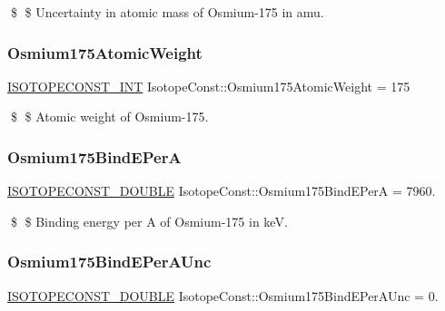 \$ \$ Uncertainty in atomic mass of Osmium-\/175 in amu. \mbox{\label{group___isotope_const-_osmium-_os175_ga68d651baca5291ae24003e9ae0e879c8}} 
\subsubsection{\texorpdfstring{Osmium175\+Atomic\+Weight}{Osmium175AtomicWeight}}
{\footnotesize\ttfamily \mbox{\hyperlink{group___isotope_const-_macros_ga5f18360b3e99483a35c32d789e62621c}{I\+S\+O\+T\+O\+P\+E\+C\+O\+N\+S\+T\+\_\+\+I\+NT}} Isotope\+Const\+::\+Osmium175\+Atomic\+Weight = 175}

\$ \$ Atomic weight of Osmium-\/175. \mbox{\label{group___isotope_const-_osmium-_os175_ga2d6c236720e29dd7ca31d141ead0cc20}} 
\subsubsection{\texorpdfstring{Osmium175\+Bind\+E\+PerA}{Osmium175BindEPerA}}
{\footnotesize\ttfamily \mbox{\hyperlink{group___isotope_const-_macros_ga8f45a7272ce02c0b4c65c44636ed719a}{I\+S\+O\+T\+O\+P\+E\+C\+O\+N\+S\+T\+\_\+\+D\+O\+U\+B\+LE}} Isotope\+Const\+::\+Osmium175\+Bind\+E\+PerA = 7960.}

\$ \$ Binding energy per A of Osmium-\/175 in keV. \mbox{\label{group___isotope_const-_osmium-_os175_gaedbee545d68a3e1fc7791326d27b60b5}} 
\subsubsection{\texorpdfstring{Osmium175\+Bind\+E\+Per\+A\+Unc}{Osmium175BindEPerAUnc}}
{\footnotesize\ttfamily \mbox{\hyperlink{group___isotope_const-_macros_ga8f45a7272ce02c0b4c65c44636ed719a}{I\+S\+O\+T\+O\+P\+E\+C\+O\+N\+S\+T\+\_\+\+D\+O\+U\+B\+LE}} Isotope\+Const\+::\+Osmium175\+Bind\+E\+Per\+A\+Unc = 0.}

